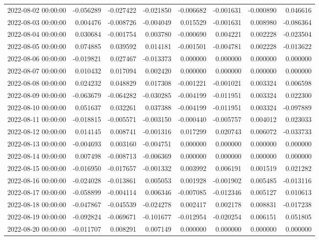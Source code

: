 \begin{tabular}{lrrrrrrr}
2022-08-02 00:00:00 & -0.056289 & -0.027422 & -0.021850 & -0.006682 & -0.001631 & -0.000890 & 0.046616 \\
2022-08-03 00:00:00 & 0.004476 & -0.008726 & -0.004049 & 0.015529 & -0.001631 & 0.008980 & -0.086364 \\
2022-08-04 00:00:00 & 0.030684 & -0.001754 & 0.003780 & -0.000690 & 0.004221 & 0.002228 & -0.023504 \\
2022-08-05 00:00:00 & 0.074885 & 0.039592 & 0.014181 & -0.001501 & -0.004781 & 0.002228 & -0.013622 \\
2022-08-06 00:00:00 & -0.019821 & 0.027467 & -0.013373 & 0.000000 & 0.000000 & 0.000000 & 0.000000 \\
2022-08-07 00:00:00 & 0.010432 & 0.017094 & 0.002420 & 0.000000 & 0.000000 & 0.000000 & 0.000000 \\
2022-08-08 00:00:00 & 0.024232 & 0.048829 & 0.017308 & -0.001221 & -0.001021 & 0.003324 & 0.006598 \\
2022-08-09 00:00:00 & -0.063679 & -0.064282 & -0.030285 & -0.004199 & -0.011951 & 0.003324 & 0.022300 \\
2022-08-10 00:00:00 & 0.051637 & 0.032261 & 0.037388 & -0.004199 & -0.011951 & 0.003324 & -0.097889 \\
2022-08-11 00:00:00 & -0.018815 & -0.005571 & -0.003150 & -0.000440 & -0.005757 & 0.004012 & 0.023033 \\
2022-08-12 00:00:00 & 0.014145 & 0.008741 & -0.001316 & 0.017299 & 0.020743 & 0.006072 & -0.033733 \\
2022-08-13 00:00:00 & -0.004693 & 0.003160 & -0.004751 & 0.000000 & 0.000000 & 0.000000 & 0.000000 \\
2022-08-14 00:00:00 & 0.007498 & -0.008713 & -0.006369 & 0.000000 & 0.000000 & 0.000000 & 0.000000 \\
2022-08-15 00:00:00 & -0.016950 & -0.017657 & -0.001332 & 0.003992 & 0.006191 & 0.001519 & 0.021282 \\
2022-08-16 00:00:00 & -0.024028 & -0.013861 & 0.005053 & 0.001928 & -0.001902 & 0.005485 & -0.013116 \\
2022-08-17 00:00:00 & -0.058899 & -0.004114 & 0.006346 & -0.007085 & -0.012346 & 0.005127 & 0.010613 \\
2022-08-18 00:00:00 & -0.047867 & -0.045539 & -0.024278 & 0.002417 & 0.002178 & 0.008831 & -0.017238 \\
2022-08-19 00:00:00 & -0.092824 & -0.069671 & -0.101677 & -0.012954 & -0.020254 & 0.006151 & 0.051805 \\
2022-08-20 00:00:00 & -0.011707 & 0.008291 & 0.007149 & 0.000000 & 0.000000 & 0.000000 & 0.000000 \\

\end{tabular}
